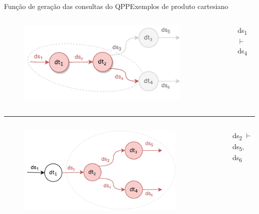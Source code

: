 \documentclass[12pt,compress,final]{beamer}
\begin{document}

\begin{frame}[t]{Função de geração das consultas do QPP}{Exemplos de produto cartesiano}

\vspace{-.75cm}

\begin{columns}[t]


\begin{figure}
\includegraphics[width=0.85\textwidth]{img/example-query-dataflow-1.pdf}
\end{figure}


\bigskip
\bigskip
ds\textsubscript{1} $\vdash$ ds\textsubscript{4}

\end{columns}

\hrule{}

\begin{columns}[t]


\begin{figure}
\includegraphics[width=0.85\textwidth]{img/example-query-dataflow-2.pdf}
\end{figure}


\bigskip
\bigskip
ds\textsubscript{2} $\vdash$ ds\textsubscript{5}, ds\textsubscript{6}

\end{columns}

\end{frame}
\end{document}
